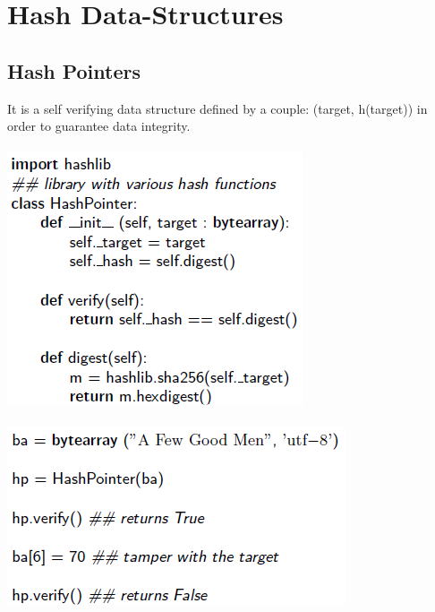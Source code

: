 \documentclass{article}
\begin{document}
\section{Hash Data-Structures}
\subsection{Hash Pointers}
It is a self verifying data structure defined by a couple: (target, h(target)) in order to guarantee data integrity.\\\\
\includegraphics[scale=0.8]{6.png}\\\\
\includegraphics[scale=0.8]{7.png}\\\\
\end{document}
